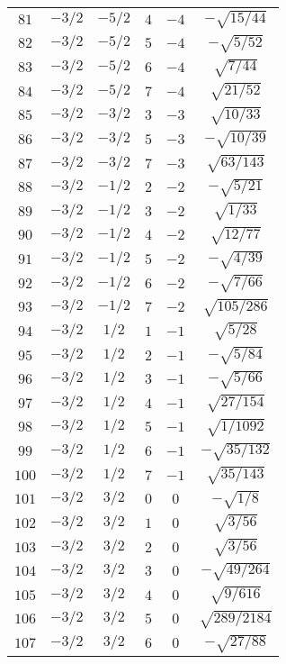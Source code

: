 \begin{table}
\begin{center}
\begin{tabular}{|c|c|c|c|c|c|}
$81$ & $-3/2$ & $-5/2$ & $4$ & $-4$ & $-\sqrt{15/44}$ \\ 
$82$ & $-3/2$ & $-5/2$ & $5$ & $-4$ & $-\sqrt{5/52}$ \\ 
$83$ & $-3/2$ & $-5/2$ & $6$ & $-4$ & $\sqrt{7/44}$ \\ 
$84$ & $-3/2$ & $-5/2$ & $7$ & $-4$ & $\sqrt{21/52}$ \\ 
$85$ & $-3/2$ & $-3/2$ & $3$ & $-3$ & $\sqrt{10/33}$ \\ 
$86$ & $-3/2$ & $-3/2$ & $5$ & $-3$ & $-\sqrt{10/39}$ \\ 
$87$ & $-3/2$ & $-3/2$ & $7$ & $-3$ & $\sqrt{63/143}$ \\ 
$88$ & $-3/2$ & $-1/2$ & $2$ & $-2$ & $-\sqrt{5/21}$ \\ 
$89$ & $-3/2$ & $-1/2$ & $3$ & $-2$ & $\sqrt{1/33}$ \\ 
$90$ & $-3/2$ & $-1/2$ & $4$ & $-2$ & $\sqrt{12/77}$ \\ 
$91$ & $-3/2$ & $-1/2$ & $5$ & $-2$ & $-\sqrt{4/39}$ \\ 
$92$ & $-3/2$ & $-1/2$ & $6$ & $-2$ & $-\sqrt{7/66}$ \\ 
$93$ & $-3/2$ & $-1/2$ & $7$ & $-2$ & $\sqrt{105/286}$ \\ 
$94$ & $-3/2$ & $1/2$ & $1$ & $-1$ & $\sqrt{5/28}$ \\ 
$95$ & $-3/2$ & $1/2$ & $2$ & $-1$ & $-\sqrt{5/84}$ \\ 
$96$ & $-3/2$ & $1/2$ & $3$ & $-1$ & $-\sqrt{5/66}$ \\ 
$97$ & $-3/2$ & $1/2$ & $4$ & $-1$ & $\sqrt{27/154}$ \\ 
$98$ & $-3/2$ & $1/2$ & $5$ & $-1$ & $\sqrt{1/1092}$ \\ 
$99$ & $-3/2$ & $1/2$ & $6$ & $-1$ & $-\sqrt{35/132}$ \\ 
$100$ & $-3/2$ & $1/2$ & $7$ & $-1$ & $\sqrt{35/143}$ \\ 
$101$ & $-3/2$ & $3/2$ & $0$ & $0$ & $-\sqrt{1/8}$ \\ 
$102$ & $-3/2$ & $3/2$ & $1$ & $0$ & $\sqrt{3/56}$ \\ 
$103$ & $-3/2$ & $3/2$ & $2$ & $0$ & $\sqrt{3/56}$ \\ 
$104$ & $-3/2$ & $3/2$ & $3$ & $0$ & $-\sqrt{49/264}$ \\ 
$105$ & $-3/2$ & $3/2$ & $4$ & $0$ & $\sqrt{9/616}$ \\ 
$106$ & $-3/2$ & $3/2$ & $5$ & $0$ & $\sqrt{289/2184}$ \\ 
$107$ & $-3/2$ & $3/2$ & $6$ & $0$ & $-\sqrt{27/88}$ \\ 

\end{tabular}
\end{center}
\end{table}
